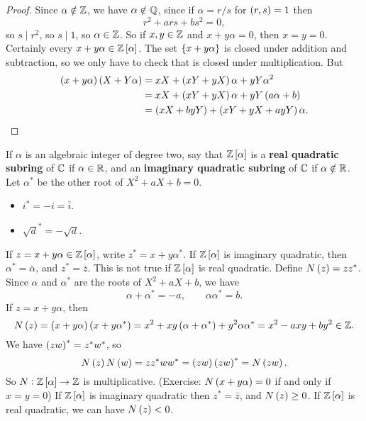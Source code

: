 \begin{proof}
Since $ \alpha \notin \mathbb{Z} $, we have $ \alpha \notin \mathbb{Q} $, since if $ \alpha = r / s $ for $ \br{r, s} = 1 $ then
$$ r^2 + ars + bs^2 = 0, $$
so $ s \mid r^2 $, so $ s \mid 1 $, so $ \alpha \in \mathbb{Z} $. So if $ x, y \in \mathbb{Z} $ and $ x + y\alpha = 0 $, then $ x = y = 0 $. Certainly every $ x + y\alpha \in \Z\sbr{\alpha} $. The set $ \cbr{x + y\alpha} $ is closed under addition and subtraction, so we only have to check that is closed under multiplication. But
\begin{align*}
\br{x + y\alpha}\br{X + Y\alpha}
& = xX + \br{xY + yX}\alpha + yY\alpha^2 \\
& = xX + \br{xY + yX}\alpha + yY\br{a\alpha + b} \\
& = \br{xX + byY} + \br{xY + yX + ayY}\alpha.
\end{align*}
\end{proof}

If $ \alpha $ is an algebraic integer of degree two, say that $ \Z\sbr{\alpha} $ is a \textbf{real quadratic subring} of $ \mathbb{C} $ if $ \alpha \in \mathbb{R} $, and an \textbf{imaginary quadratic subring} of $ \mathbb{C} $ if $ \alpha \notin \mathbb{R} $. Let $ \alpha^* $ be the other root of $ X^2 + aX + b = 0 $.

\begin{example*}
\hfill
\begin{itemize}
\item $ i^* = -i = \bar{i} $.
\item $ \sqrt{d}^* = -\sqrt{d} $.
\end{itemize}
\end{example*}

If $ z = x + y\alpha \in \Z\sbr{\alpha} $, write $ z^* = x + y\alpha^* $. If $ \Z\sbr{\alpha} $ is imaginary quadratic, then $ \alpha^* = \bar{\alpha} $, and $ z^* = \bar{z} $. This is not true if $ \Z\sbr{\alpha} $ is real quadratic. Define $ N\br{z} = zz^* $. Since $ \alpha $ and $ \alpha^* $ are the roots of $ X^2 + aX + b $, we have
$$ \alpha + \alpha^* = -a, \qquad \alpha\alpha^* = b. $$
If $ z = x + y\alpha $, then
$$ N\br{z} = \br{x + y\alpha}\br{x + y\alpha^*} = x^2 + xy\br{\alpha + \alpha^*} + y^2\alpha\alpha^* = x^2 - axy + by^2 \in \Z. $$
We have $ \br{zw}^* = z^*w^* $, so
$$ N\br{z}N\br{w} = zz^*ww^* = \br{zw}\br{zw}^* = N\br{zw}. $$
So $ N : \Z\sbr{\alpha} \to \Z $ is multiplicative. (Exercise: $ N\br{x + y\alpha} = 0 $ if and only if $ x = y = 0 $) If $ \Z\sbr{\alpha} $ is imaginary quadratic then $ z^* = \bar{z} $, and $ N\br{z} \ge 0 $. If $ \Z\sbr{\alpha} $ is real quadratic, we can have $ N\br{z} < 0 $.

